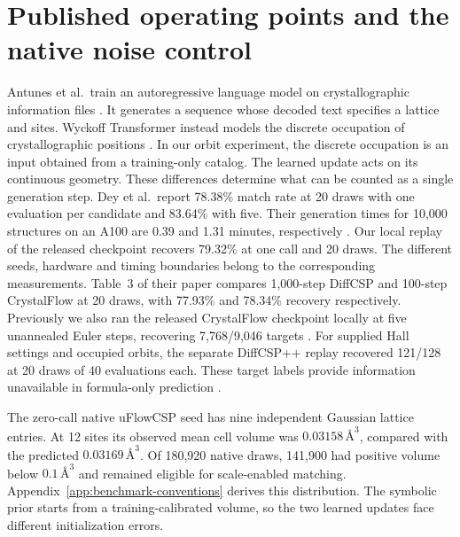 \section{Published operating points and the native noise control}
Antunes et al.\ train an autoregressive language model on crystallographic information files \cite{crystallm}. It generates a sequence whose decoded text specifies a lattice and sites. Wyckoff Transformer instead models the discrete occupation of crystallographic positions \cite{wyformer}. In our orbit experiment, the discrete occupation is an input obtained from a training-only catalog. The learned update acts on its continuous geometry. These differences determine what can be counted as a single generation step.
Dey et al.\ report 78.38\% match rate at 20 draws with one evaluation per candidate and 83.64\% with five. Their generation times for 10,000 structures on an A100 are 0.39 and 1.31 minutes, respectively \cite{uflow}. Our local replay of the released checkpoint recovers 79.32\% at one call and 20 draws. The different seeds, hardware and timing boundaries belong to the corresponding measurements. Table~3 of their paper compares 1,000-step DiffCSP and 100-step CrystalFlow at 20 draws, with 77.93\% and 78.34\% recovery respectively. Previously we also ran the released CrystalFlow checkpoint locally at five unannealed Euler steps, recovering 7,768/9,046 targets \cite{crystalflow}. For supplied Hall settings and occupied orbits, the separate DiffCSP++ replay recovered 121/128 at 20 draws of 40 evaluations each. These target labels provide information unavailable in formula-only prediction \cite{diffcspplus}.

The zero-call native uFlowCSP seed has nine independent Gaussian lattice entries. At 12 sites its observed mean cell volume was \(0.03158\,\text{\AA}^3\), compared with the predicted \(0.03169\,\text{\AA}^3\). Of 180,920 native draws, 141,900 had positive volume below \(0.1\,\text{\AA}^3\) and remained eligible for scale-enabled matching. Appendix~\ref{app:benchmark-conventions} derives this distribution. The symbolic prior starts from a training-calibrated volume, so the two learned updates face different initialization errors.
